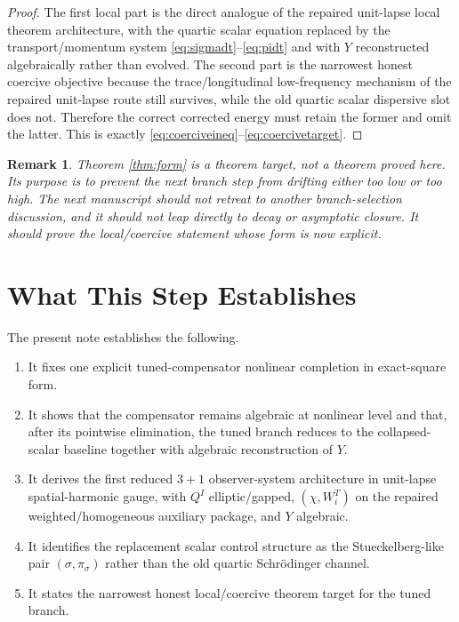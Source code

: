 \documentclass[11pt]{article}
\newtheorem{remark}{Remark}
\begin{document}
\begin{proof}
The first local part is the direct analogue of the repaired unit-lapse local theorem architecture, with the quartic scalar equation replaced by the transport/momentum system \eqref{eq:sigmadt}--\eqref{eq:pidt} and with \(Y\) reconstructed algebraically rather than evolved. The second part is the narrowest honest coercive objective because the trace/longitudinal low-frequency mechanism of the repaired unit-lapse route still survives, while the old quartic scalar dispersive slot does not. Therefore the correct corrected energy must retain the former and omit the latter. This is exactly \eqref{eq:coerciveineq}--\eqref{eq:coercivetarget}.
\end{proof}

\begin{remark}
Theorem \ref{thm:form} is a theorem \emph{target}, not a theorem proved here. Its purpose is to prevent the next branch step from drifting either too low or too high. The next manuscript should not retreat to another branch-selection discussion, and it should not leap directly to decay or asymptotic closure. It should prove the local/coercive statement whose form is now explicit.
\end{remark}

\section{What This Step Establishes}

The present note establishes the following.
\begin{enumerate}
    \item It fixes one explicit tuned-compensator nonlinear completion in exact-square form.
    \item It shows that the compensator remains algebraic at nonlinear level and that, after its pointwise elimination, the tuned branch reduces to the collapsed-scalar baseline together with algebraic reconstruction of \(Y\).
    \item It derives the first reduced \(3+1\) observer-system architecture in unit-lapse spatial-harmonic gauge, with \(Q^I\) elliptic/gapped, \((\chi,W_i^T)\) on the repaired weighted/homogeneous auxiliary package, and \(Y\) algebraic.
    \item It identifies the replacement scalar control structure as the Stueckelberg-like pair \((\sigma,\pi_\sigma)\) rather than the old quartic Schr\"odinger channel.
    \item It states the narrowest honest local/coercive theorem target for the tuned branch.
\end{enumerate}
\end{document}
